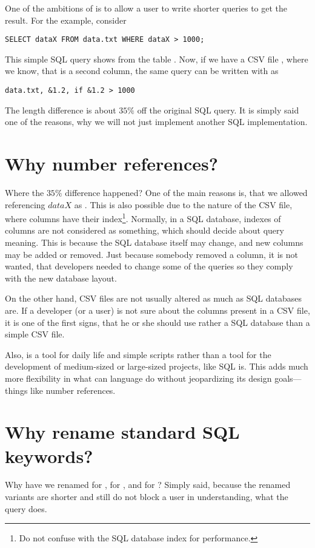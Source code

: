 One of the ambitions of  is to allow a user to write shorter queries to get the result. For the example,
consider

\begin{verbatim}
SELECT dataX FROM data.txt WHERE dataX > 1000;
\end{verbatim}

This simple SQL query shows  from the table . 
Now, if we have a CSV file , where we know, that  is a second column, the same query can 
be written with  as

\begin{verbatim}
data.txt, &1.2, if &1.2 > 1000
\end{verbatim}

The length difference is about $35\%$ off the original SQL query. It is simply said one of the reasons, 
why we will not just implement another SQL implementation.

\section{Why number references?}
Where the $35\%$ difference happened? One of the main reasons is, that we allowed referencing $dataX$ as .
This is also possible due to the nature of the CSV file, where columns have their index\footnote{Do not confuse with the SQL database index for performance.}. 
Normally, in a SQL database, indexes of columns are not considered as something, which should decide about query meaning.
This is because the SQL database itself may change, and new columns may be added or removed. Just because somebody removed a column, 
it is not wanted, that developers needed to change some of the queries so they comply with the new database layout.

On the other hand, CSV files are not usually altered as much as SQL databases are. 
If a developer (or a user) is not sure about the columns present in a CSV file, it is one of the first signs, that
he or she should use rather a SQL database than a simple CSV file.

Also,  is a tool for daily life and simple scripts rather than a tool for the development of medium-sized or
large-sized projects, like SQL is. This adds much more flexibility in what can language do without jeopardizing its design goals---things like number references.

\section{Why rename standard SQL keywords?}
Why have we renamed  for ,  for , and  for ? Simply said, because the renamed variants are shorter and still do not block a user in understanding, what the query does.


